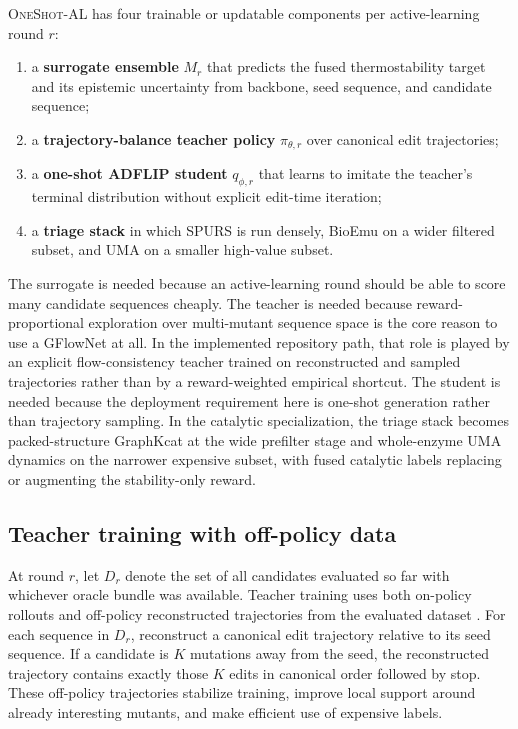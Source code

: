 \documentclass[11pt]{article}
\newcommand{\methodIII}{\textsc{OneShot-AL}}
\begin{document}
	\methodIII{} has four trainable or updatable components per active-learning round $r$:
	\begin{enumerate}[leftmargin=1.5em]
		\item a \textbf{surrogate ensemble} $M_r$ that predicts the fused thermostability target and its epistemic uncertainty from backbone, seed sequence, and candidate sequence;
		\item a \textbf{trajectory-balance teacher policy} $\pi_{\theta,r}$ over canonical edit trajectories;
		\item a \textbf{one-shot ADFLIP student} $q_{\phi,r}$ that learns to imitate the teacher's terminal distribution without explicit edit-time iteration;
		\item a \textbf{triage stack} in which SPURS is run densely, BioEmu on a wider filtered subset, and UMA on a smaller high-value subset.
	\end{enumerate}
	The surrogate is needed because an active-learning round should be able to score many candidate sequences cheaply. The teacher is needed because reward-proportional exploration over multi-mutant sequence space is the core reason to use a GFlowNet at all. In the implemented repository path, that role is played by an explicit flow-consistency teacher trained on reconstructed and sampled trajectories rather than by a reward-weighted empirical shortcut. The student is needed because the deployment requirement here is one-shot generation rather than trajectory sampling. In the catalytic specialization, the triage stack becomes packed-structure GraphKcat at the wide prefilter stage and whole-enzyme UMA dynamics on the narrower expensive subset, with fused catalytic labels replacing or augmenting the stability-only reward.
	
	\subsection{Teacher training with off-policy data}
	
	At round $r$, let $D_r$ denote the set of all candidates evaluated so far with whichever oracle bundle was available. Teacher training uses both on-policy rollouts and off-policy reconstructed trajectories from the evaluated dataset \citep{jain2022bioseqgfn}. For each sequence in $D_r$, reconstruct a canonical edit trajectory relative to its seed sequence. If a candidate is $K$ mutations away from the seed, the reconstructed trajectory contains exactly those $K$ edits in canonical order followed by stop. These off-policy trajectories stabilize training, improve local support around already interesting mutants, and make efficient use of expensive labels.
	
\end{document}
